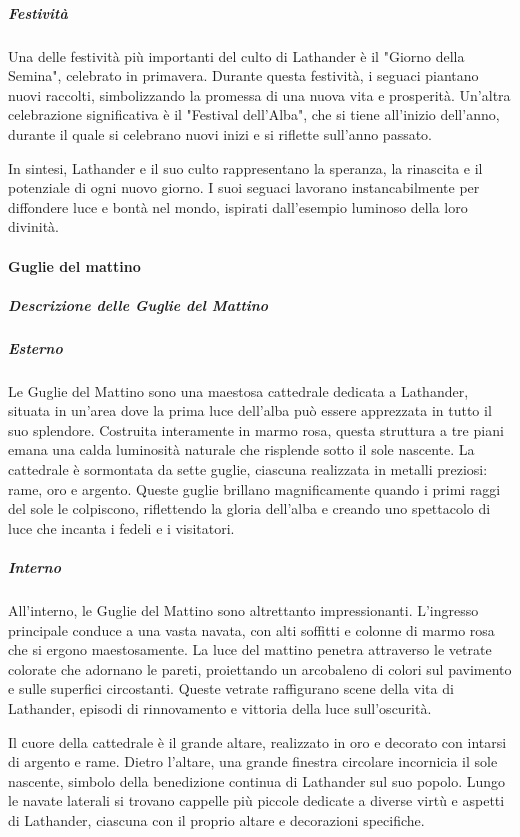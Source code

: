 \documentclass{article}
\begin{document}
\subparagraph{Festività}
Una delle festività più importanti del culto di Lathander è il "Giorno della Semina", celebrato in primavera. Durante questa festività, i seguaci piantano nuovi raccolti, simbolizzando la promessa di una nuova vita e prosperità. Un'altra celebrazione significativa è il "Festival dell'Alba", che si tiene all'inizio dell'anno, durante il quale si celebrano nuovi inizi e si riflette sull'anno passato.

In sintesi, Lathander e il suo culto rappresentano la speranza, la rinascita e il potenziale di ogni nuovo giorno. I suoi seguaci lavorano instancabilmente per diffondere luce e bontà nel mondo, ispirati dall'esempio luminoso della loro divinità.

\paragraph{Guglie del mattino}
            \subparagraph{Descrizione delle Guglie del Mattino}

            \subparagraph{Esterno}
            Le Guglie del Mattino sono una maestosa cattedrale dedicata a Lathander, situata in un'area dove la prima luce dell'alba può essere apprezzata in tutto il suo splendore. Costruita interamente in marmo rosa, questa struttura a tre piani emana una calda luminosità naturale che risplende sotto il sole nascente. La cattedrale è sormontata da sette guglie, ciascuna realizzata in metalli preziosi: rame, oro e argento. Queste guglie brillano magnificamente quando i primi raggi del sole le colpiscono, riflettendo la gloria dell'alba e creando uno spettacolo di luce che incanta i fedeli e i visitatori.
            
            \subparagraph{Interno}
            All'interno, le Guglie del Mattino sono altrettanto impressionanti. L'ingresso principale conduce a una vasta navata, con alti soffitti e colonne di marmo rosa che si ergono maestosamente. La luce del mattino penetra attraverso le vetrate colorate che adornano le pareti, proiettando un arcobaleno di colori sul pavimento e sulle superfici circostanti. Queste vetrate raffigurano scene della vita di Lathander, episodi di rinnovamento e vittoria della luce sull'oscurità.
            
            Il cuore della cattedrale è il grande altare, realizzato in oro e decorato con intarsi di argento e rame. Dietro l'altare, una grande finestra circolare incornicia il sole nascente, simbolo della benedizione continua di Lathander sul suo popolo. Lungo le navate laterali si trovano cappelle più piccole dedicate a diverse virtù e aspetti di Lathander, ciascuna con il proprio altare e decorazioni specifiche.
            
\end{document}
